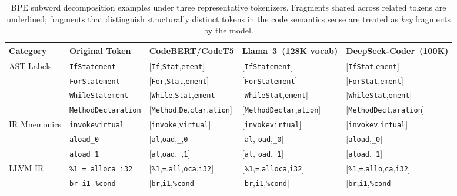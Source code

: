 \documentclass[pdflatex,sn-mathphys,Numbered]{sn-jnl}
\begin{document}
\begin{table}[tb]
\centering
\caption{BPE subword decomposition examples under three representative tokenizers. Fragments shared across related tokens are \underline{underlined}; fragments that distinguish structurally distinct tokens in the code semantics sense are treated as \emph{key} fragments by the model.\label{tab:bpe-examples}}
\begin{tabular}{lllll}
\toprule
Category & Original Token & CodeBERT/CodeT5 & Llama~3~(128K vocab) & DeepSeek-Coder~(100K) \\
\midrule
\multirow{4}{*}{AST Labels}
  & \texttt{IfStatement}      & [\texttt{If},\texttt{Stat},\texttt{ement}] & [\texttt{IfStatement}] & [\texttt{IfStat},\texttt{ement}] \\
  & \texttt{ForStatement}     & [\texttt{For},\texttt{Stat},\texttt{ement}] & [\texttt{ForStatement}] & [\texttt{ForStat},\texttt{ement}] \\
  & \texttt{WhileStatement}   & [\texttt{While},\texttt{Stat},\texttt{ement}] & [\texttt{WhileStat},\texttt{ement}] & [\texttt{WhileStat},\texttt{ement}] \\
  & \texttt{MethodDeclaration}& [\texttt{Method},\texttt{De},\texttt{clar},\texttt{ation}] & [\texttt{MethodDeclar},\texttt{ation}] & [\texttt{MethodDecl},\texttt{aration}] \\
\midrule
\multirow{3}{*}{IR Mnemonics}
  & \texttt{invokevirtual}    & [\texttt{invoke},\texttt{virtual}] & [\texttt{invokevirtual}] & [\texttt{invokev},\texttt{irtual}] \\
  & \texttt{aload\_0}         & [\texttt{al},\texttt{oad},\texttt{\_},\texttt{0}] & [\texttt{al}, \texttt{oad},\texttt{\_0}] & [\texttt{aload},\texttt{\_0}] \\
  & \texttt{aload\_1}         & [\texttt{al},\texttt{oad},\texttt{\_},\texttt{1}] & [\texttt{al}, \texttt{oad},\texttt{\_1}] & [\texttt{aload},\texttt{\_1}] \\
\midrule
\multirow{2}{*}{LLVM IR}
  & \texttt{\%1 = alloca i32} & [\texttt{\%1},\texttt{=},\texttt{all},\texttt{oca},\texttt{i32}] & [\texttt{\%1},\texttt{=},\texttt{alloca},\texttt{i32}] & [\texttt{\%1},\texttt{=},\texttt{allo},\texttt{ca},\texttt{i32}] \\
  & \texttt{br i1 \%cond}     & [\texttt{br},\texttt{i1},\texttt{\%cond}] & [\texttt{br},\texttt{i1},\texttt{\%cond}] & [\texttt{br},\texttt{i1},\texttt{\%cond}] \\
\bottomrule
\end{tabular}
\end{table}
\end{document}

